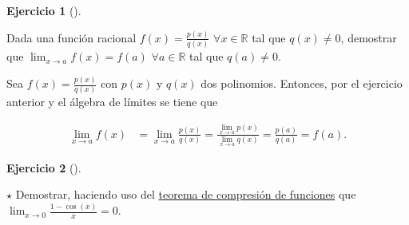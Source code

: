 \documentclass[
  spanish,
  a4paper,
]{scrreport}
\theoremstyle{definition}
\newtheorem{exercise}{Ejercicio}[chapter]
\theoremstyle{remark}
\begin{document}
\begin{exercise}[]\protect\hypertarget{exr-limite-funciones-racionales}{}\label{exr-limite-funciones-racionales}

Dada una función racional \(f(x)=\frac{p(x)}{q(x)}\)
\(\forall x\in\mathbb{R}\) tal que \(q(x)\neq 0\), demostrar que
\(\lim_{x\to a}f(x)=f(a)\) \(\forall a\in\mathbb{R}\) tal que
\(q(a)\neq 0\).

\end{exercise}

\begin{tcolorbox}[enhanced jigsaw, arc=.35mm, bottomrule=.15mm, bottomtitle=1mm, breakable, colback=white, colbacktitle=quarto-callout-tip-color!10!white, colframe=quarto-callout-tip-color-frame, coltitle=black, left=2mm, leftrule=.75mm, opacityback=0, opacitybacktitle=0.6, rightrule=.15mm, title=\textcolor{quarto-callout-tip-color}{\faLightbulb}\hspace{0.5em}{Solución}, titlerule=0mm, toprule=.15mm, toptitle=1mm]

Sea \(f(x)=\frac{p(x)}{q(x)}\) con \(p(x)\) y \(q(x)\) dos polinomios.
Entonces, por el ejercicio anterior y el álgebra de límites se tiene que

\begin{align*}
\lim_{x\to a}f(x) &= \lim_{x\to a} \frac{p(x)}{q(x)} = \frac{\lim_{x\to a} p(x)}{\lim_{x\to a}q(x)} = \frac{p(a)}{q(a)}=f(a).
\end{align*}

\end{tcolorbox}

\begin{exercise}[]\protect\hypertarget{exr-limite-emparedado}{}\label{exr-limite-emparedado}

\(\star\) Demostrar, haciendo uso del
\href{https://aprendeconalf.es/analisis-manual/limites.html\#thm-compresión-funciones}{teorema
de compresión de funciones} que
\(\lim_{x\to 0}\frac{1-\cos(x)}{x} = 0\).

\end{exercise}
\end{document}

